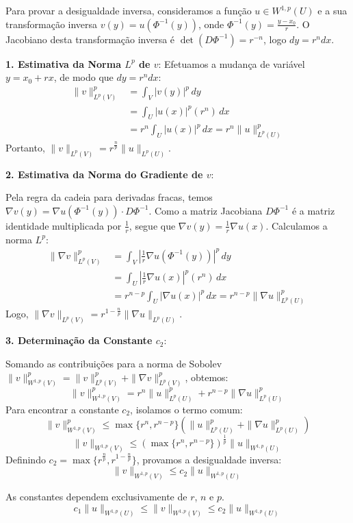 \documentclass[cs_edp_2026.1.tex]{subfiles} %
\begin{document}
{	Para provar a desigualdade inversa, consideramos a função $u \in W^{1,p}(U)$ e a sua transformação inversa $v(y) = u(\Phi^{-1}(y))$, onde $\Phi^{-1}(y) = \frac{y - x_0}{r}$. O Jacobiano desta transformação inversa é $\det(D\Phi^{-1}) = r^{-n}$, logo $dy = r^n dx$.
	
	\textbf{1. Estimativa da Norma $L^p$ de $v$}:
	Efetuamos a mudança de variável $y = x_0 + rx$, de modo que $dy = r^n dx$:
	\begin{align*}
		\|v\|_{L^p(V)}^p &= \int_V |v(y)|^p \, dy \\
		&= \int_U |u(x)|^p (r^n) \, dx \\
		&= r^n \int_U |u(x)|^p \, dx = r^n \|u\|_{L^p(U)}^p
	\end{align*}
	Portanto, $\|v\|_{L^p(V)} = r^{\frac{n}{p}} \|u\|_{L^p(U)}$.
	
	\textbf{2. Estimativa da Norma do Gradiente de $v$}:\par
	Pela regra da cadeia para derivadas fracas, temos $\nabla v(y) = \nabla u(\Phi^{-1}(y)) \cdot D\Phi^{-1}$. Como a matriz Jacobiana $D\Phi^{-1}$ é a matriz identidade multiplicada por $\frac{1}{r}$, segue que $\nabla v(y) = \frac{1}{r} \nabla u(x)$. Calculamos a norma $L^p$:
	\begin{align*}
		\|\nabla v\|_{L^p(V)}^p &= \int_V \left| \frac{1}{r} \nabla u(\Phi^{-1}(y)) \right|^p \, dy \\
		&= \int_U \left| \frac{1}{r} \nabla u(x) \right|^p (r^n) \, dx \\
		&= r^{n-p} \int_U |\nabla u(x)|^p \, dx = r^{n-p} \|\nabla u\|_{L^p(U)}^p
	\end{align*}
	Logo, $\|\nabla v\|_{L^p(V)} = r^{1 - \frac{n}{p}} \|\nabla u\|_{L^p(U)}$.
	
	\textbf{3. Determinação da Constante $c_2$}:\par
	Somando as contribuições para a norma de Sobolev $\|v\|_{W^{1,p}(V)}^p = \|v\|_{L^p(V)}^p + \|\nabla v\|_{L^p(V)}^p$, obtemos:
	$$\|v\|_{W^{1,p}(V)}^p = r^n \|u\|_{L^p(U)}^p + r^{n-p} \|\nabla u\|_{L^p(U)}^p$$
	Para encontrar a constante $c_2$, isolamos o termo comum:
	$$\|v\|_{W^{1,p}(V)}^p \le \max\{r^n, r^{n-p}\} \left( \|u\|_{L^p(U)}^p + \|\nabla u\|_{L^p(U)}^p \right)$$
	$$ \|v\|_{W^{1,p}(V)} \le \left( \max\{r^n, r^{n-p}\} \right)^{\frac{1}{p}} \|u\|_{W^{1,p}(U)} $$
	Definindo $c_2 = \max\{r^{\frac{n}{p}}, r^{1 - \frac{n}{p}}\}$, provamos a desigualdade inversa:
	$$\boxed{\|v\|_{W^{1,p}(V)} \le c_2 \|u\|_{W^{1,p}(U)}}$$
	
	
	As constantes dependem exclusivamente de $r$, $n$ e $p$.
	$$\boxed{c_1 \|u\|_{W^{1,p}(U)} \le \|v\|_{W^{1,p}(V)} \le c_2 \|u\|_{W^{1,p}(U)}}$$
}
\end{document}
